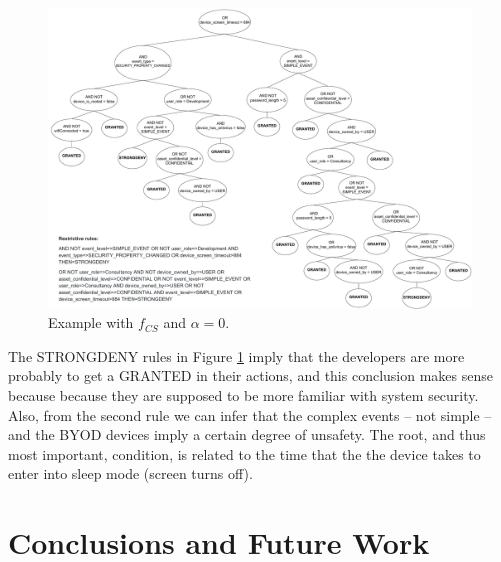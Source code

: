 \documentclass[runningheads]{llncs}
\begin{document}
\begin{figure}[h!tb]
	\centering
	\includegraphics[width=\textwidth]{img/bestInd_fCS_a0.pdf}
	\caption{Example with $f_{CS}$ and $\alpha=0$.} 
	\label{fig:bestInd_fCS_a0}
\end{figure}

The STRONGDENY rules in Figure \ref{fig:bestInd_fCS_a0} imply that
the developers are more probably to get a GRANTED in their actions,
and this conclusion makes sense because because they are supposed to
be more familiar with system security. Also, from the second rule we
can infer that the complex events -- not simple -- and the BYOD
devices imply a certain degree of unsafety. The root, and thus most important, condition, is related to the time that the the device takes to enter into sleep mode (screen turns off). 



\section{Conclusions and Future Work}
\label{sec:future}
\end{document}
